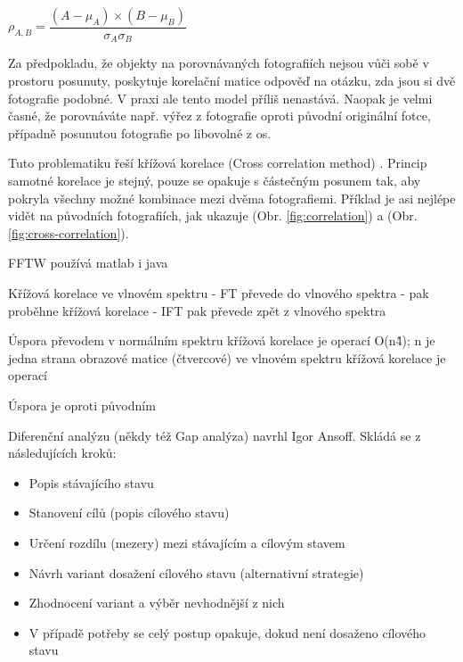 $ \rho_{A,B} = \dfrac{(A - \mu_{A}) × (B - \mu_{B})}{\sigma_{A}\sigma_{B}} $

Za předpokladu, že objekty na porovnávaných fotografiích nejsou vůči sobě v prostoru posunuty, poskytuje korelační matice odpověď na otázku, zda jsou si dvě fotografie podobné. V praxi ale tento model příliš nenastává. Naopak je velmi časné, že porovnáváte např. výřez z fotografie oproti původní originální fotce, případně posunutou fotografie po libovolné z os.

Tuto problematiku řeší křížová korelace (Cross correlation method) \cite{cross-correlation}. Princip samotné korelace je stejný, pouze se opakuje s částečným posunem tak, aby pokryla všechny možné kombinace mezi dvěma fotografiemi. Příklad je asi nejlépe vidět na původních fotografiích, jak ukazuje (Obr. \ref{fig:correlation}) a (Obr. \ref{fig:cross-correlation}).




FFTW
používá matlab i java

Křížová korelace ve vlnovém spektru
- FT převede do vlnového spektra
- pak proběhne křížová korelace
- IFT pak převede zpět z vlnového spektra

Úspora převodem 
v normálním spektru křížová korelace je operací O(n\^4); n je jedna strana obrazové matice (čtvercové)
ve vlnovém spektru křížová korelace je operací 

Úspora je oproti původním 


Diferenční analýzu (někdy též Gap analýza) navrhl Igor Ansoff. Skládá se z následujících kroků:
\begin{itemize}
	\setlength{\parskip}{0pt}
	\setlength{\itemsep}{0pt}
	\item{Popis stávajícího stavu}
	\item{Stanovení cílů (popis cílového stavu)}
	\item{Určení rozdílu (mezery) mezi stávajícím a cílovým stavem}
	\item{Návrh variant dosažení cílového stavu (alternativní strategie)}
	\item{Zhodnocení variant a výběr nevhodnější z nich}
	\item{V případě potřeby se celý postup opakuje, dokud není dosaženo cílového stavu}
\end{itemize}

